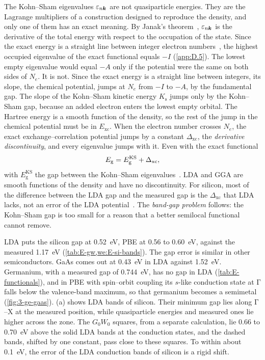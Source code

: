 The Kohn--Sham eigenvalues $\varepsilon_{n\bm{k}}$ are not quasiparticle energies. They are the Lagrange multipliers of a construction designed to reproduce the density, and only one of them has an exact meaning. By Janak's theorem~\cite{janak1978proof}, $\varepsilon_{n\bm{k}}$ is the derivative of the total energy with respect to the occupation of the state. Since the exact energy is a straight line between integer electron numbers~\cite{perdew1982density}, the highest occupied eigenvalue of the exact functional equals $-I$ (\cref{app:D.5}). The lowest empty eigenvalue would equal $-A$ only if the potential were the same on both sides of $N_e$. It is not. Since the exact energy is a straight line between integers, its slope, the chemical potential, jumps at $N_e$ from $-I$ to $-A$, by the fundamental gap. The slope of the Kohn--Sham kinetic energy $K_{\mathrm{s}}$ jumps only by the Kohn--Sham gap, because an added electron enters the lowest empty orbital. The Hartree energy is a smooth function of the density, so the rest of the jump in the chemical potential must be in $E_{\mathrm{xc}}$. When the electron number crosses $N_e$, the exact exchange--correlation potential jumps by a constant $\Delta_{\mathrm{xc}}$, the \emph{derivative discontinuity}, and every eigenvalue jumps with it. Even with the exact functional
\begin{equation}
  E_{\mathrm{g}} = E_{\mathrm{g}}^{\mathrm{KS}} + \Delta_{\mathrm{xc}} ,
  \label{eq:3.4-gap}
\end{equation}
with $E_{\mathrm{g}}^{\mathrm{KS}}$ the gap between the Kohn--Sham eigenvalues~\cite{perdew1983physical,sham1983density}. LDA and GGA are smooth functions of the density and have no discontinuity. For silicon, most of the difference between the LDA gap and the measured gap is the $\Delta_{\mathrm{xc}}$ that LDA lacks, not an error of the LDA potential~\cite{godby1986accurate}. The \emph{band-gap problem} follows: the Kohn--Sham gap is too small for a reason that a better semilocal functional cannot remove.

LDA puts the silicon gap at \SI{0.52}{eV}, PBE at 0.56 to \SI{0.60}{eV}, against the measured \SI{1.17}{eV} (\cref{tab:E-gw,we:E-si-bands}). The gap error is similar in other semiconductors. GaAs comes out at \SI{0.43}{eV} in LDA against \SI{1.52}{eV}. Germanium, with a measured gap of \SI{0.744}{eV}, has no gap in LDA (\cref{tab:E-functionals}), and in PBE with spin--orbit coupling its $s$-like conduction state at $\mathrm{\Gamma}$ falls below the valence-band maximum, so that germanium becomes a semimetal (\cref{fig:3-ge-gaas}). (a) shows LDA bands of silicon. Their minimum gap lies along $\mathrm{\Gamma}$--$\mathrm{X}$ at the measured position, while quasiparticle energies and measured ones lie higher across the zone. The $G_0W_0$ squares, from a separate calculation, lie 0.66 to \SI{0.70}{eV} above the solid LDA bands at the conduction states, and the dashed bands, shifted by one constant, pass close to these squares. To within about \SI{0.1}{eV}, the error of the LDA conduction bands of silicon is a rigid shift.

